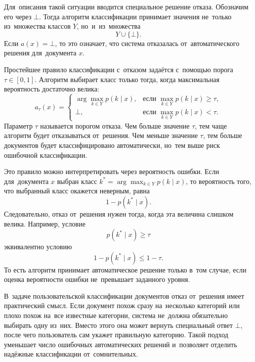 Для~описания такой ситуации вводится специальное решение отказа. Обозначим его
через \( \bot \). Тогда алгоритм классификации принимает значения не~только
из~множества классов \( Y \), но~и~из~множества
\begin{equation}
    \label{eq:equation8}
    Y \cup \{\bot\}.
\end{equation}
Если \( a(x) = \bot \), то это означает, что система отказалась от~автоматического
решения для~документа \( x \).

Простейшее правило классификации с~отказом задаётся с~помощью порога
\( \tau \in [0,1] \). Алгоритм выбирает класс только тогда, когда максимальная
вероятность достаточно велика:
\begin{equation}
    \label{eq:decision-rule}
    a_{\tau}(x) =
    \begin{cases}
        \arg\max\limits_{k \in Y} p(k \mid x),
        & \text{если } \max\limits_{k \in Y} p(k \mid x) \geqslant \tau, \\
        \bot,
        & \text{если } \max\limits_{k \in Y} p(k \mid x) < \tau.
    \end{cases}
\end{equation}
Параметр \( \tau \) называется порогом отказа. Чем больше значение \( \tau \),
тем чаще алгоритм будет отказываться от~решения. Чем меньше значение \( \tau \),
тем больше документов будет классифицировано автоматически, но~тем выше риск
ошибочной классификации.

Это правило можно интерпретировать через вероятность ошибки. Если для~документа
\( x \) выбран класс \( k^* = \arg\max_{k \in Y} p(k \mid x) \),
то вероятность того, что выбранный класс окажется неверным, равна
\begin{equation}
    \label{eq:equation11}
    1 - p(k^* \mid x).
\end{equation}
Следовательно, отказ от~решения нужен тогда, когда эта величина слишком велика.
Например, условие
\begin{equation}
    \label{eq:equation12}
    p(k^* \mid x) \geqslant \tau
\end{equation}
эквивалентно условию
\begin{equation}
    \label{eq:equation13}
    1 - p(k^* \mid x) \leqslant 1 - \tau.
\end{equation}
То есть алгоритм принимает автоматическое решение только в~том случае, если
оценка вероятности ошибки не~превышает заданного уровня.

В~задаче пользовательской классификации документов отказ от~решения имеет
практический смысл. Если документ похож сразу на~несколько категорий или плохо
похож на~все известные категории, система не~должна обязательно выбирать одну
из~них. Вместо этого она может вернуть специальный ответ \( \bot \), после чего
пользователь сам укажет правильную категорию. Такой подход уменьшает число
ошибочных автоматических решений и~позволяет отделить надёжные классификации
от~сомнительных.

